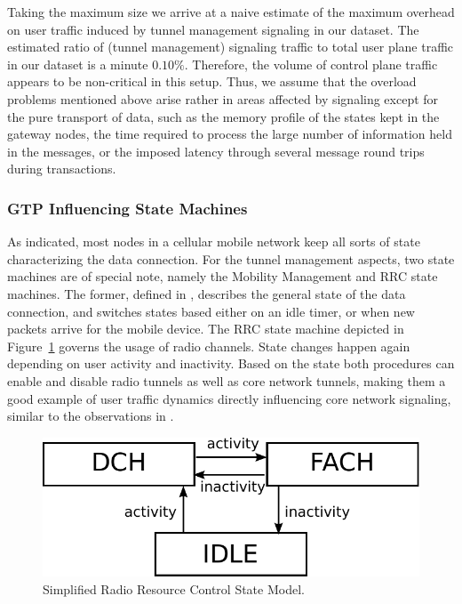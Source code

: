 Taking the maximum size we arrive at a naive estimate of the maximum overhead on user traffic induced by tunnel management signaling in our dataset. The estimated ratio of (tunnel management) signaling traffic to total user plane traffic in our dataset is a minute $0.10\%$. Therefore, the volume of control plane traffic appears to be non-critical in this setup. Thus, we assume that the overload problems mentioned above arise rather in areas affected by signaling except for the pure transport of data, such as the memory profile of the states kept in the gateway nodes, the time required to process the large number of information held in the messages, or the imposed latency through several message round trips during transactions.


\subsubsection{GTP Influencing State Machines}

As indicated, most nodes in a cellular mobile network keep all sorts of state characterizing the data connection. For the tunnel management aspects, two state machines are of special note, namely the Mobility Management and RRC state machines.
The former, defined in \cite{3gpp23.060}, describes the general state of the data connection, and switches states based either on an idle timer, or when new packets arrive for the mobile device. The \ac{RRC} state machine depicted in Figure~\ref{c4:fig:rrcstatemodel} governs the usage of radio channels. State changes happen again depending on user activity and inactivity.
Based on the state both procedures can enable and disable radio tunnels as well as core network tunnels, making them a good example of user traffic dynamics directly influencing core network signaling, similar to the observations in \cite{lee2007detection}.

\begin{figure}[htbp]
	\centering
	\includegraphics[width=0.8\columnwidth]{images/IMC2013/rrc-simplified-state-model.pdf}
	\caption{Simplified Radio Resource Control State Model.}
	\label{c4:fig:rrcstatemodel}
\end{figure}


